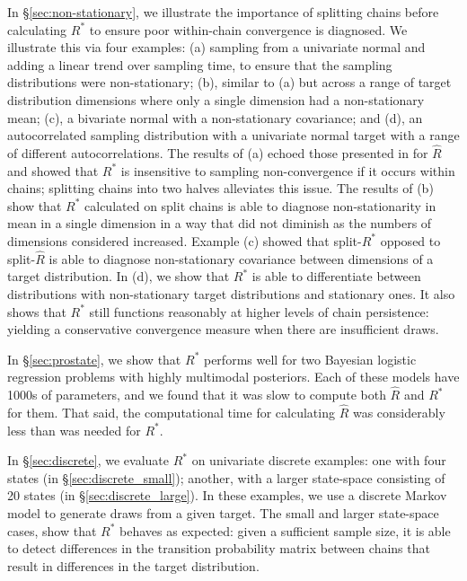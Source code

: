 \documentclass[ba]{imsart}
\numberwithin{equation}{section}
\theoremstyle{plain}
\begin{document}
In \S\ref{sec:non-stationary}, we illustrate the importance of splitting chains before calculating $R^*$ to ensure poor within-chain convergence is diagnosed. We illustrate this via four examples: (a) sampling from a univariate normal and adding a linear trend over sampling time, to ensure that the sampling distributions were non-stationary; (b), similar to (a) but across a range of target distribution dimensions where only a single dimension had a non-stationary mean; (c), a bivariate normal with a non-stationary covariance; and (d), an autocorrelated sampling distribution with a univariate normal target with a range of different autocorrelations. The results of (a) echoed those presented in \cite{vehtari2019rank} for $\widehat{R}$ and showed that $R^*$ is insensitive to sampling non-convergence if it occurs within chains; splitting chains into two halves alleviates this issue. The results of (b) show that $R^*$ calculated on split chains is able to diagnose non-stationarity in mean in a single dimension in a way that did not diminish as the numbers of dimensions considered increased. Example (c) showed that split-$R^*$ opposed to split-$\widehat{R}$ is able to diagnose non-stationary covariance between dimensions of a target distribution. In (d), we show that $R^*$ is able to differentiate between distributions with non-stationary target distributions and stationary ones. It also shows that $R^*$ still functions reasonably at higher levels of chain persistence: yielding a conservative convergence measure when there are insufficient draws.

In \S\ref{sec:prostate}, we show that $R^*$ performs well for two Bayesian logistic regression problems with highly multimodal posteriors. Each of these models have 1000s of parameters, and we found that it was slow to compute both $\widehat{R}$ and $R^*$ for them. That said, the computational time for calculating $\widehat{R}$ was considerably less than was needed for $R^*$.

In \S\ref{sec:discrete}, we evaluate $R^*$ on univariate discrete examples: one with four states (in \S\ref{sec:discrete_small}); another, with a larger state-space consisting of 20 states (in \S\ref{sec:discrete_large}). In these examples, we use a discrete Markov model to generate draws from a given target. The small and larger state-space cases, show that $R^*$ behaves as expected: given a sufficient sample size, it is able to detect differences in the transition probability matrix between chains that result in differences in the target distribution.
\end{document}
